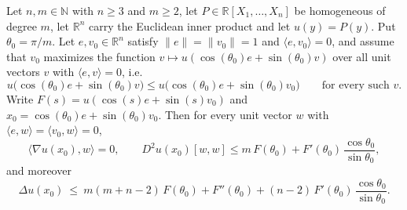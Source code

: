 \begin{lemma}
Let $n,m\in\mathbb{N}$ with $n\ge3$ and $m\ge2$, let
$P\in\mathbb{R}[X_1,\dots,X_n]$ be homogeneous of degree $m$, let $\mathbb{R}^n$
carry the Euclidean inner product and let $u(y)=P(y)$. Put $\theta_0=\pi/m$. Let
$e,v_0\in\mathbb{R}^n$ satisfy $\lVert e\rVert=\lVert v_0\rVert=1$ and
$\langle e,v_0\rangle=0$, and assume that $v_0$ maximizes the function
$v\mapsto u(\cos(\theta_0)e+\sin(\theta_0)v)$ over all unit vectors $v$ with
$\langle e,v\rangle=0$, i.e.
\[
  u\bigl(\cos(\theta_0)e+\sin(\theta_0)v\bigr)
   \le u\bigl(\cos(\theta_0)e+\sin(\theta_0)v_0\bigr)
  \qquad\text{for every such }v .
\]
Write $F(s)=u(\cos(s)e+\sin(s)v_0)$ and
$x_0=\cos(\theta_0)e+\sin(\theta_0)v_0$. Then for every unit vector $w$ with
$\langle e,w\rangle=\langle v_0,w\rangle=0$,
\[
  \bigl\langle\nabla u(x_0),w\bigr\rangle=0,
  \qquad
  D^2u(x_0)[w,w]\le m\,F(\theta_0)+F'(\theta_0)\,
    \frac{\cos\theta_0}{\sin\theta_0},
\]
and moreover
\[
  \Delta u(x_0)\ \le\ m(m+n-2)\,F(\theta_0)+F''(\theta_0)
    +(n-2)\,F'(\theta_0)\,\frac{\cos\theta_0}{\sin\theta_0}.
\]
\end{lemma}

